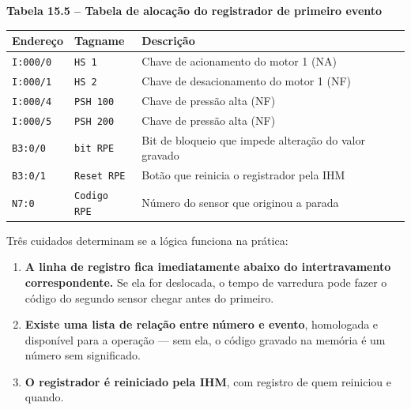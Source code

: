 \textbf{Tabela 15.5 -- Tabela de alocação do registrador de primeiro evento}

\begin{longtable}[]{@{}
  >{\raggedright\arraybackslash}p{}
  >{\raggedright\arraybackslash}p{}
  >{\raggedright\arraybackslash}p{}@{}}
\toprule\noalign{}
\begin{minipage}[b]{\linewidth}\raggedright
Endereço
\end{minipage} & \begin{minipage}[b]{\linewidth}\raggedright
Tagname
\end{minipage} & \begin{minipage}[b]{\linewidth}\raggedright
Descrição
\end{minipage} \\
\midrule\noalign{}
\endhead
\bottomrule\noalign{}
\endlastfoot
\passthrough{\lstinline!I:000/0!} & \passthrough{\lstinline!HS 1!} & Chave de acionamento do motor 1 (NA) \\
\passthrough{\lstinline!I:000/1!} & \passthrough{\lstinline!HS 2!} & Chave de desacionamento do motor 1 (NF) \\
\passthrough{\lstinline!I:000/4!} & \passthrough{\lstinline!PSH 100!} & Chave de pressão alta (NF) \\
\passthrough{\lstinline!I:000/5!} & \passthrough{\lstinline!PSH 200!} & Chave de pressão alta (NF) \\
\passthrough{\lstinline!B3:0/0!} & \passthrough{\lstinline!bit RPE!} & Bit de bloqueio que impede alteração do valor gravado \\
\passthrough{\lstinline!B3:0/1!} & \passthrough{\lstinline!Reset RPE!} & Botão que reinicia o registrador pela IHM \\
\passthrough{\lstinline!N7:0!} & \passthrough{\lstinline!Codigo RPE!} & Número do sensor que originou a parada \\
\end{longtable}

Três cuidados determinam se a lógica funciona na prática:

\begin{enumerate}
\def\labelenumi{\arabic{enumi}.}
\tightlist
\item
  \textbf{A linha de registro fica imediatamente abaixo do intertravamento correspondente.} Se ela for
  deslocada, o tempo de varredura pode fazer o código do segundo sensor chegar antes do primeiro.
\item
  \textbf{Existe uma lista de relação entre número e evento}, homologada e disponível para a operação ---
  sem ela, o código gravado na memória é um número sem significado.
\item
  \textbf{O registrador é reiniciado pela IHM}, com registro de quem reiniciou e quando.
\end{enumerate}

